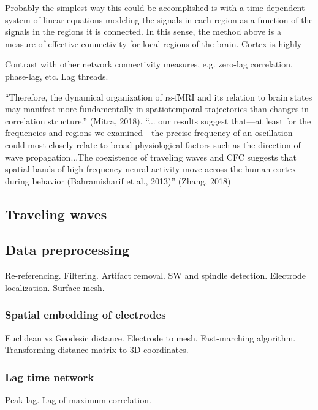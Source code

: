 Probably the simplest way this could be accomplished is with a time dependent system of linear equations modeling the signals in each region as a function of the signals in the regions it is connected. In this sense, the method above is a measure of effective connectivity for local regions of the brain. Cortex is highly 

Contrast with other network connectivity measures, e.g. zero-lag correlation, phase-lag, etc. Lag threads.

“Therefore, the dynamical organization of rs-fMRI and its relation to brain states may manifest more fundamentally in spatiotemporal trajectories than changes in correlation structure.” (Mitra, 2018). “... our results suggest that—at least for the frequencies and regions we examined—the precise frequency of an oscillation could most closely relate to broad physiological factors such as the direction of wave propagation...The coexistence of traveling waves and CFC suggests that spatial bands of high-frequency neural activity move across the human cortex during behavior (Bahramisharif et al., 2013)” (Zhang, 2018)

\subsection*{Traveling waves}
\subsection*{Data preprocessing}
Re-referencing. Filtering. Artifact removal. SW and spindle detection.
Electrode localization. Surface mesh. 
\subsubsection*{Spatial embedding of electrodes}
Euclidean vs Geodesic distance. Electrode to mesh. Fast-marching algorithm. Transforming distance matrix to 3D coordinates.

\subsubsection*{Lag time network}
Peak lag. Lag of maximum correlation. 

